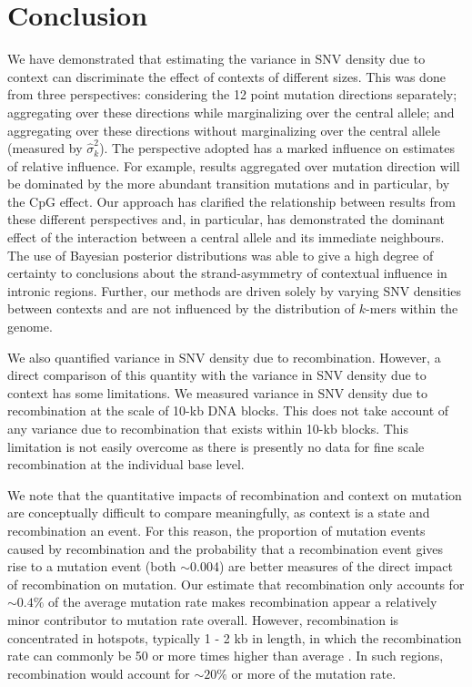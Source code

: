 \section*{Conclusion}

We have demonstrated that estimating the variance in SNV density due to context can discriminate the effect of contexts of different sizes. This was done from three perspectives:  considering the 12 point mutation directions separately; aggregating over these directions while marginalizing over the central allele; and aggregating over these directions without marginalizing over the central allele (measured by $\hat\sigma^2_k$). The perspective adopted has a marked influence on estimates of relative influence. For example, results aggregated over mutation direction will be dominated by the more abundant transition mutations and in particular, by the CpG effect. Our approach has clarified the relationship between results from these different perspectives and, in particular, has demonstrated the dominant effect of the interaction between a central allele and its immediate neighbours. The use of Bayesian posterior distributions was able to give a high degree of certainty to conclusions about the strand-asymmetry of contextual influence in intronic regions. Further, our methods are driven solely by varying SNV densities between contexts and are not influenced by the distribution of $k$-mers within the genome. 

We also quantified variance in SNV density due to recombination. However, a direct comparison of this quantity with the variance in SNV density due to context has some limitations. We measured variance in SNV density due to recombination at the scale of 10-kb DNA blocks. This does not take account of any variance due to recombination that exists within 10-kb blocks. This limitation is not easily overcome as there is presently no data for fine  scale recombination at the individual base level.

We note that the quantitative impacts of recombination and context on mutation are conceptually difficult to compare meaningfully, as context is a state and recombination an event. For this reason, the proportion of mutation events caused by recombination and the probability that a recombination event gives rise to a mutation event (both $\sim$0.004) are better measures of the direct impact of recombination on mutation. Our estimate that recombination only accounts for $\sim 0.4\%$ of the average mutation rate makes recombination appear a relatively minor contributor to mutation rate overall. However, recombination is concentrated in hotspots, typically 1 - 2 kb in length, in which the recombination rate can commonly be 50 or more  times higher than average \citep{international2005haplotype}.  In such regions, recombination would account for $\sim20\%$ or more of the mutation rate.